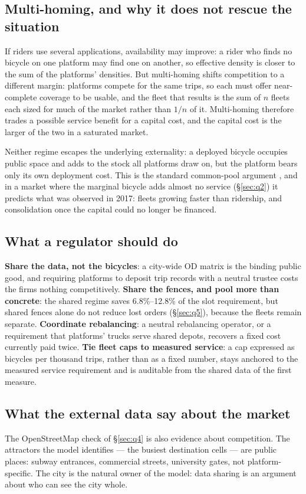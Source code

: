\subsection{Multi-homing, and why it does not rescue the situation}\label{sec:multihome}

If riders use several applications, availability may improve: a rider who finds no
bicycle on one platform may find one on another, so effective density is closer to the
sum of the platforms' densities. But multi-homing shifts competition to a different
margin: platforms compete for the same trips, so each must offer near-complete coverage
to be usable, and the fleet that results is the sum of $n$ fleets each sized for much of
the market rather than $1/n$ of it. Multi-homing therefore trades a possible service
benefit for a capital cost, and the capital cost is the larger of the two in a
saturated market.

Neither regime escapes the underlying externality: a deployed bicycle
occupies public space and adds to the stock all platforms draw on, but the
platform bears only its own deployment cost. This is the standard common-pool
argument \cite{katz1985,rochet2003}, and in a market where the marginal bicycle adds
almost no service (\S\ref{sec:q2}) it predicts what was observed in 2017:
fleets growing faster than ridership, and consolidation once the capital could no
longer be financed.

\subsection{What a regulator should do}

\textbf{Share the data, not the bicycles}: a city-wide OD matrix is
the binding public good, and requiring platforms to deposit trip records with a
neutral trustee costs the firms nothing competitively. \textbf{Share the fences, and
pool more than concrete}: the shared regime saves 6.8\%--12.8\% of the slot
requirement, but shared fences alone do not reduce lost orders (\S\ref{sec:q5}),
because the fleets remain separate. \textbf{Coordinate rebalancing}: a neutral
rebalancing operator, or a requirement that platforms' trucks serve shared depots,
recovers a fixed cost currently paid twice. \textbf{Tie fleet caps to measured
service}: a cap expressed as bicycles per thousand trips, rather than as a fixed
number, stays anchored to the measured service requirement and is auditable from the
shared data of the first measure.

\subsection{What the external data say about the market}

The OpenStreetMap check of \S\ref{sec:q4} is also evidence about competition. The
attractors the model identifies --- the busiest destination cells --- are public
places: subway entrances, commercial streets, university gates, not platform-specific.
The city is the natural owner of the model: data sharing is an argument about who can see the city
whole.
